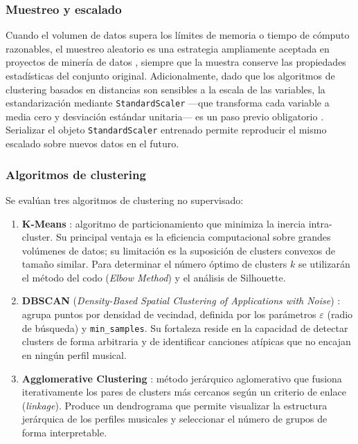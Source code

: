 \subsubsection{Muestreo y escalado}

Cuando el volumen de datos supera los límites de memoria o tiempo de cómputo razonables, el muestreo aleatorio es una estrategia ampliamente aceptada en proyectos de minería de datos \cite{han2011data}, siempre que la muestra conserve las propiedades estadísticas del conjunto original. Adicionalmente, dado que los algoritmos de clustering basados en distancias son sensibles a la escala de las variables, la estandarización mediante \texttt{StandardScaler} ---que transforma cada variable a media cero y desviación estándar unitaria--- es un paso previo obligatorio \cite{pedregosa2011scikit}. Serializar el objeto \texttt{StandardScaler} entrenado permite reproducir el mismo escalado sobre nuevos datos en el futuro.

\subsubsection{Algoritmos de clustering}

Se evalúan tres algoritmos de clustering no supervisado:

\begin{enumerate}
    \item \textbf{K-Means} \cite{macqueen1967some}: algoritmo de particionamiento que minimiza la inercia intra-cluster. Su principal ventaja es la eficiencia computacional sobre grandes volúmenes de datos; su limitación es la suposición de clusters convexos de tamaño similar. Para determinar el número óptimo de clusters $k$ se utilizarán el método del codo (\textit{Elbow Method}) y el análisis de Silhouette.
    \item \textbf{DBSCAN} (\textit{Density-Based Spatial Clustering of Applications with Noise}) \cite{ester1996density}: agrupa puntos por densidad de vecindad, definida por los parámetros $\varepsilon$ (radio de búsqueda) y \texttt{min\_samples}. Su fortaleza reside en la capacidad de detectar clusters de forma arbitraria y de identificar canciones atípicas que no encajan en ningún perfil musical.
    \item \textbf{Agglomerative Clustering} \cite{murtagh2012algorithms}: método jerárquico aglomerativo que fusiona iterativamente los pares de clusters más cercanos según un criterio de enlace (\textit{linkage}). Produce un dendrograma que permite visualizar la estructura jerárquica de los perfiles musicales y seleccionar el número de grupos de forma interpretable.
\end{enumerate}

